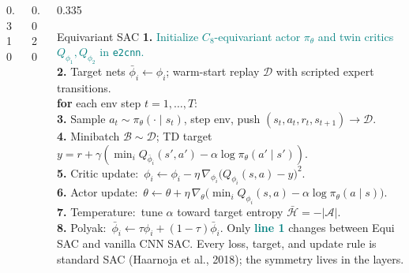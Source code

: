 \documentclass[final]{beamer}
\newcommand{\eq}[1]{\textcolor{Teal}{#1}}
\begin{document}
\begin{frame}[t]
\begin{columns}[t,totalwidth=\textwidth]
\begin{column}{0.310\textwidth}
\end{column}

\begin{column}{0.020\textwidth}\end{column}

\begin{column}{0.335\textwidth}
\vspace{0pt}

\begin{block}{Equivariant SAC}
\small
\textbf{1.} \eq{Initialize $C_{8}$-equivariant actor $\pi_{\theta}$ and twin critics $Q_{\phi_{1}},Q_{\phi_{2}}$ in \texttt{e2cnn}.}\\[0.20em]
\textbf{2.} Target nets $\bar{\phi}_{i}\!\leftarrow\!\phi_{i}$; warm-start replay $\mathcal{D}$ with scripted expert transitions.\\[0.20em]
\textbf{for} each env step $t=1,\ldots,T$:\\[0.20em]
\hspace*{1em}\textbf{3.} Sample $a_{t}\sim\pi_{\theta}(\cdot\mid s_{t})$, step env, push $(s_{t},a_{t},r_{t},s_{t+1})\to\mathcal{D}$.\\[0.20em]
\hspace*{1em}\textbf{4.} Minibatch $\mathcal{B}\sim\mathcal{D}$; TD target\ $y=r+\gamma\!\left(\min_{i}Q_{\bar{\phi}_{i}}(s',a')-\alpha\log\pi_{\theta}(a'\mid s')\right)$.\\[0.20em]
\hspace*{1em}\textbf{5.} Critic update:\ $\phi_{i}\leftarrow\phi_{i}-\eta\,\nabla_{\phi_{i}}\bigl(Q_{\phi_{i}}(s,a)-y\bigr)^{2}$.\\[0.20em]
\hspace*{1em}\textbf{6.} Actor update:\ $\theta\leftarrow\theta+\eta\,\nabla_{\theta}\!\bigl(\min_{i}Q_{\phi_{i}}(s,a)-\alpha\log\pi_{\theta}(a\mid s)\bigr)$.\\[0.20em]
\hspace*{1em}\textbf{7.} Temperature:\ tune $\alpha$ toward target entropy $\bar{\mathcal{H}}=-|\mathcal{A}|$.\\[0.20em]
\hspace*{1em}\textbf{8.} Polyak:\ $\bar{\phi}_{i}\leftarrow\tau\phi_{i}+(1-\tau)\bar{\phi}_{i}$.
\normalsize
\vspace{0.10cm}
{\small Only \textcolor{Teal}{\textbf{line 1}} changes between Equi SAC and vanilla CNN SAC. Every loss, target, and update rule is standard SAC (Haarnoja et al., 2018); the symmetry lives in the layers.}
\end{block}


\end{column}
\end{columns}
\end{frame}
\end{document}
